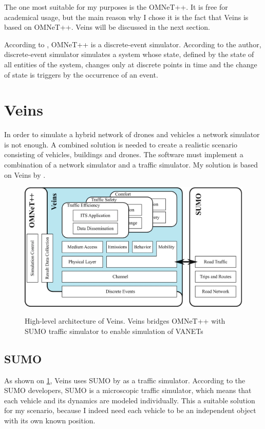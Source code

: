 \documentclass[]{nsm-thesis}
\begin{document}
The one most suitable for my purposes is the OMNeT++. It is free for academical usage, but the main reason why I chose it is the fact that Veins \cite{Sommer2019} is based on OMNeT++. Veins will be discussed in the next section.

According to \textcite[Page~2]{Varga2010}, OMNeT++ is a discrete-event simulator. According to the author, discrete-event simulator simulates a system whose state, defined by the state of all entities of the system, changes only at discrete points in time and the change of state is triggers by the occurrence of an event.

\section {Veins}

In order to simulate a hybrid network of drones and vehicles a network simulator is not enough. A combined solution is needed to create a realistic scenario consisting of vehicles, buildings and drones. The software must implement a combination of a network simulator and a traffic simulator. My solution is based on Veins by \textcite{Sommer2019}.

\begin{figure}
  	\caption{High-level architecture of Veins. Veins bridges OMNeT++ with SUMO traffic simulator to enable simulation of \acp{VANET} \cite{Sommer2019}}
	\centering
	\includegraphics[width=1\textwidth]{figures/High-level Veins.png}
	\label{fig:veinshighlevel}
\end{figure}

\subsection{SUMO}
As shown on \ref{fig:veinshighlevel}, Veins uses SUMO by \textcite{sumo2018} as a traffic simulator. According to the SUMO developers, SUMO is a microscopic traffic simulator, which means that each vehicle and its dynamics are modeled individually.
This a suitable solution for my scenario, because I indeed need each vehicle to be an independent object with its own known position.
\end{document}
